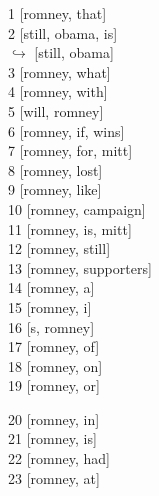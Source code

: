 \documentclass[letterpaper,12pt,titlepage,oneside,final]{book}
\begin{document}
\begin{figure}[h]
\footnotesize
\begin{minipage}[t]{0.33\textwidth}
1 [romney, that] \\
      2 [still, obama, is] \\
      $\hookrightarrow$  [still, obama] \\
      3 [romney, what] \\
      4 [romney, with] \\
      5 [will, romney] \\
      6 [romney, if, wins] \\
      7 [romney, for, mitt] \\
      8 [romney, lost] \\
     9 [romney, like] \\
     10 [romney, campaign] \\
     11 [romney, is, mitt] \\
     12 [romney, still] \\
     13 [romney, supporters] \\
     14 [romney, a] \\
     15 [romney, i] \\
     16 [s, romney] \\
     17 [romney, of] \\
     18 [romney, on] \\
19 [romney, or]

     20 [romney, in] \\
     21 [romney, is] \\
    22 [romney, had] \\    
     23 [romney, at] 

        \end{minipage}
\begin{minipage}[t]{0.33\textwidth}


\end{minipage}
\end{figure}
\end{document}
